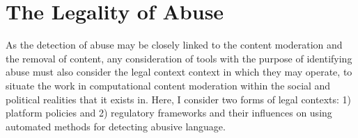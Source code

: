 %

\section{The Legality of Abuse}

As the detection of abuse may be closely linked to the content moderation and the removal of content, any consideration of tools with the purpose of identifying abuse must also consider the legal context context in which they may operate, to situate the work in computational content moderation within the social and political realities that it exists in.
Here, I consider two forms of legal contexts: 1) platform policies and 2) regulatory frameworks and their influences on using automated methods for detecting abusive language.

